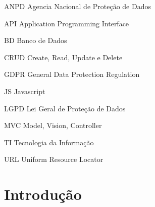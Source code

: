\documentclass[
	12pt,				%
	openright,			%
	oneside,			%
	a4paper,			%
	english,			%
	french,				%
	spanish,			%
	brazil,				%
	]{abntex2}
\begin{document}
\listoffigures*
\cleardoublepage

\listoftables*
\cleardoublepage

\begin{siglas}
    \item[ANPD] Agencia Nacional de Proteção de Dados
    \item[API] Application Programming Interface
    \item[BD] Banco de Dados
    \item[CRUD] Create, Read, Update e Delete
    \item[GDPR]  General Data Protection Regulation
    \item [JS] Javascript
    \item[LGPD] Lei Geral de Proteção de Dados
    \item[MVC] Model, Vision, Controller
    \item[TI] Tecnologia da Informação
    \item[URL] Uniform Resource Locator
\end{siglas}


\tableofcontents*



\textual
\setcounter{page}{1}
\chapter*{Introdução}
\label{chapter:introducao}
\end{document}
